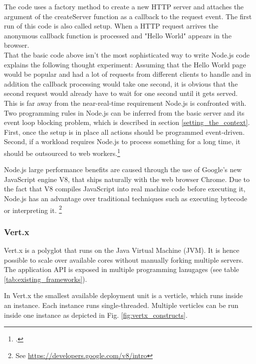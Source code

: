 The code uses a factory method to create a new HTTP server and attaches the
argument of the createServer function as a callback to the request event. The
first run of this code is also called setup. When a HTTP request arrives the
anonymous callback function is processed and "Hello World" appears in the
browser.\\
That the basic code above isn't the most sophisticated way to write Node.js code
explains the following thought experiment: Assuming that the Hello World page
would be popular and had a lot of requests from different clients to handle and
in addition the callback processing would take one second, it is obvious that the second
request would already have to wait for one second until it gets served. This is far away 
from the near-real-time requirement Node.js is confronted with.\\
Two programming rules in Node.js can be inferred from the basic server and its
event loop blocking problem, which is described in section \ref{setting_the_context}.
First, once the setup is in place all actions should be programmed event-driven.
Second, if a workload requires Node.js to process something for a long time,
it should be outsourced to web workers.\footcite[Cf.][]{Croucher_2012}

Node.js large performance benefits are caused through the use of Google's new JavaScript engine V8, that ships naturally
with the web browser Chrome. Due to the fact that V8 compiles JavaScript into
real machine code before executing it, Node.js has an advantage over 
traditional techniques such as executing bytecode or interpreting it. \footnote{See \url{https://developers.google.com/v8/intro}}


\subsubsection{Vert.x}
\label{vert.x}

Vert.x is a polyglot that runs on the Java Virtual Machine (JVM). It is hence
possible to scale over available cores without manually forking multiple
servers.\\
The application API is exposed in multiple programming lanugages (see table
\ref{tab:existing_frameworks}).

In Vert.x the smallest available deployment unit is a verticle, which runs
inside an instance. Each instance runs single-threaded.
Multiple verticles can be run inside one instance as depicted in Fig.
\ref{fig:vertx_constructs}.

